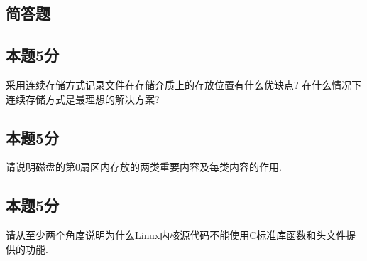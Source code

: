 \documentclass[a4paper,11pt]{article}
\begin{document}
\begin{CJK*}{UTF8}{gbsn}
\section{简答题}
\subsection{本题5分}
采用连续存储方式记录文件在存储介质上的存放位置有什么优缺点?
在什么情况下连续存储方式是最理想的解决方案?
\\[1in]


\subsection{本题5分}
请说明磁盘的第0扇区内存放的两类重要内容及每类内容的作用.
\\[1in]

\subsection{本题5分}
请从至少两个角度说明为什么Linux内核源代码不能使用C标准库函数和头文件提供的功能.
\\[1.5in]

\end{CJK*}
\end{document}
